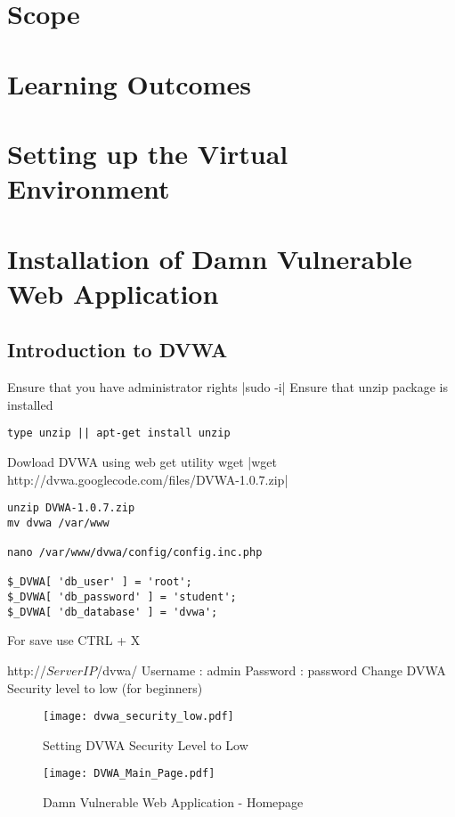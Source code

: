 \section{Scope}
\section{Learning Outcomes} 
\section{Setting up the Virtual Environment}
\section{Installation of Damn Vulnerable Web Application}
\subsection{Introduction to DVWA}

Ensure that you have administrator rights
|sudo -i|
Ensure that unzip package is installed
\begin{verbatim}
type unzip || apt-get install unzip
\end{verbatim}
Dowload DVWA using web get utility wget
|wget http://dvwa.googlecode.com/files/DVWA-1.0.7.zip|

\begin{verbatim}
unzip DVWA-1.0.7.zip
mv dvwa /var/www

nano /var/www/dvwa/config/config.inc.php

$_DVWA[ 'db_user' ] = 'root';
$_DVWA[ 'db_password' ] = 'student';
$_DVWA[ 'db_database' ] = 'dvwa';
\end{verbatim}
For save use  CTRL + X


http://$ServerIP$/dvwa/
Username : admin
Password : password
Change DVWA Security level to low (for beginners)

\begin{figure}[H] 
 \centering 
 \texttt{[image: dvwa\_security\_low.pdf]} 
 \caption{Setting DVWA Security Level to Low} 
 \label{Setting DVWA Security Level to Low} 
\end{figure}


\begin{figure}[H] 
 \centering 
 \texttt{[image: DVWA\_Main\_Page.pdf]} 
 \caption{Damn Vulnerable Web Application - Homepage} 
 \label{Damn Vulnerable Web Application - Homepage} 
\end{figure}
